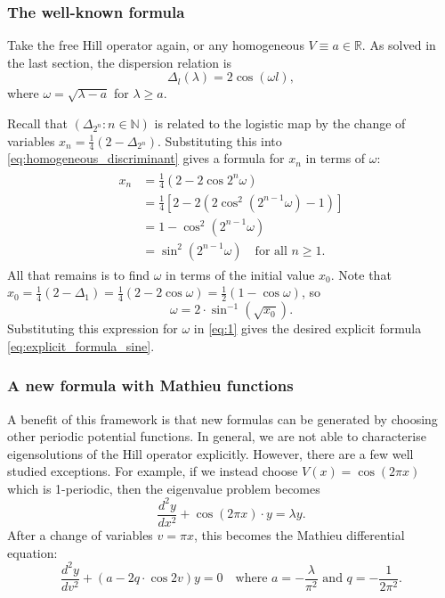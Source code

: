 \documentclass[a4paper]{article}
\theoremstyle{definition}
\numberwithin{equation}{section}
\numberwithin{theorem}{section}
\begin{document}
{\subsubsection{The well-known formula}
Take the free Hill operator again, or any homogeneous $V\equiv a\in\mathbb{R}$. As solved in the last section, the dispersion relation is
\begin{equation} \label{eq:homogeneous_discriminant}
    \Delta_l(\lambda) =2\cos(\omega l),
\end{equation}
where $\omega=\sqrt{\lambda-a}$ for $\lambda\geq a$.

Recall that $(\Delta_{2^n}:n\in\mathbb{N})$ is related to the logistic map by the change of variables $x_n = \frac{1}{4}(2-\Delta_{2^n})$. Substituting this into \eqref{eq:homogeneous_discriminant} gives a formula for $x_n$ in terms of $\omega$:
\begin{align} \label{eq:1}
    \begin{split}
        x_n &= \frac{1}{4}(2-2\cos{2^n\omega})\\
        &=\frac{1}{4}[2-2(2\cos^2{(2^{n-1}\omega)}-1)]\\
        &=1-\cos^2{(2^{n-1}\omega)}\\
        &=\sin^2{(2^{n-1}\omega)}\quad\text{for all $n\geq1$.} 
    \end{split}
\end{align}
All that remains is to find $\omega$ in terms of the initial value $x_0$. Note that $x_0 = \frac{1}{4}(2-\Delta_1) = \frac{1}{4}(2-2\cos{\omega}) = \frac{1}{2}(1-\cos{\omega})$, so
\begin{equation*}
    \omega = 2\cdot\sin^{-1}(\sqrt{x_0}).
\end{equation*}
Substituting this expression for $\omega$ in \eqref{eq:1} gives the desired explicit formula \eqref{eq:explicit_formula_sine}.

\subsubsection{A new formula with Mathieu functions} \label{sec:Mathieu}

A benefit of this framework is that new formulas can be generated by choosing other periodic potential functions. In general, we are not able to characterise eigensolutions of the Hill operator explicitly. However, there are a few well studied exceptions. For example, if we instead choose $V(x) = \cos(2\pi x)$ which is 1-periodic, then the eigenvalue problem becomes
\begin{equation*}
    \frac{d^2y}{dx^2}+\cos(2\pi x)\cdot y = \lambda y.
\end{equation*}
After a change of variables $v =\pi x$, this becomes the Mathieu differential equation:
\begin{equation} \label{eq:Mathieu}
    \frac{d^2y}{dv^2} + \left(a-2q\cdot\cos{2v}\right)y=0\quad\text{where $a=-\frac{\lambda}{\pi^2}$ and $q=-\frac{1}{2\pi^2}$.}
\end{equation}

}
\end{document}
